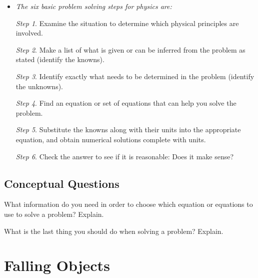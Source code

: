 \documentclass[
]{book}
\newenvironment{conceptual-questions}{}{}
\begin{document}
\begin{itemize}
\item
  \protect\hypertarget{import-auto-id927917}{}{\emph{The six basic problem solving steps for physics
  are:}}

  \emph{Step 1}. Examine the situation to determine which physical
  principles are involved.

  \emph{Step 2}. Make a list of what is given or can be inferred from the
  problem as stated (identify the knowns).

  \emph{Step 3}. Identify exactly what needs to be determined in the
  problem (identify the unknowns).

  \emph{Step 4}. Find an equation or set of equations that can help you
  solve the problem.

  \emph{Step 5}. Substitute the knowns along with their units into the
  appropriate equation, and obtain numerical solutions complete with
  units.

  \emph{Step 6}. Check the answer to see if it is reasonable: Does it make
  sense?
\end{itemize}

\hypertarget{fs-id2577484}{}
\begin{conceptual-questions}

\hypertarget{conceptual-questions-4}{%
\subsection{Conceptual Questions}\label{conceptual-questions-4}}

\hypertarget{fs-id4087579}{}
\leavevmode\hypertarget{fs-id4067228}{}%
What information do you need in order to choose which equation or
equations to use to solve a problem? Explain.

\hypertarget{fs-id1986766}{}
\leavevmode\hypertarget{fs-id2013359}{}%
What is the last thing you should do when solving a problem? Explain.

\end{conceptual-questions}

\hypertarget{falling-objects}{%
\section{Falling Objects}\label{falling-objects}}
\end{document}
